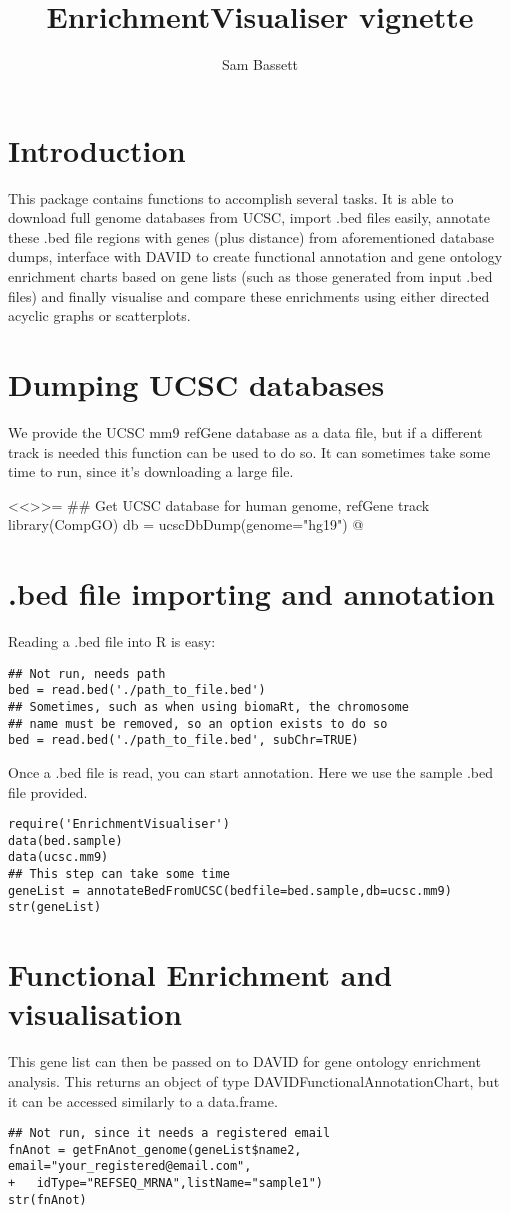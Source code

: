 \documentclass[11pt, oneside]{article}
\title{EnrichmentVisualiser vignette}
\author{Sam Bassett}
\affil{Developmental and Stem Cell Biology Lab,\\Victor Chang Cardiac Research Institute,\\Darlinghurst, Sydney, Australia}
\date{}
\begin{document}
\maketitle
\section{Introduction}
This package contains functions to accomplish several tasks. It is able to download full genome databases from UCSC, import .bed files easily, annotate these .bed file regions with genes (plus distance) from aforementioned database dumps, interface with DAVID to create functional annotation and gene ontology enrichment charts based on gene lists (such as those generated from input .bed files) and finally visualise and compare these enrichments using either directed acyclic graphs or scatterplots.

\section{Dumping UCSC databases}
We provide the UCSC mm9 refGene database as a data file, but if a different track is needed this function can be used to do so. It can sometimes take some time to run, since it's downloading a large file.

<<>>=
## Get UCSC database for human genome, refGene track
library(CompGO)
db = ucscDbDump(genome="hg19")
@

\section{.bed file importing and annotation}
Reading a .bed file into R is easy: \begin{verbatim}
## Not run, needs path
bed = read.bed('./path_to_file.bed')
## Sometimes, such as when using biomaRt, the chromosome
## name must be removed, so an option exists to do so
bed = read.bed('./path_to_file.bed', subChr=TRUE)
\end{verbatim}
Once a .bed file is read, you can start annotation. Here we use the sample .bed file provided.
\begin{verbatim}
require('EnrichmentVisualiser')
data(bed.sample)
data(ucsc.mm9)
## This step can take some time
geneList = annotateBedFromUCSC(bedfile=bed.sample,db=ucsc.mm9)
str(geneList)
\end{verbatim}

\section{Functional Enrichment and visualisation}
This gene list can then be passed on to DAVID for gene ontology enrichment analysis. This returns an object of type DAVIDFunctionalAnnotationChart, but it can be accessed similarly to a data.frame.
\begin{verbatim}
## Not run, since it needs a registered email
fnAnot = getFnAnot_genome(geneList$name2, email="your_registered@email.com",
+	idType="REFSEQ_MRNA",listName="sample1")
str(fnAnot)
\end{verbatim}
\end{document}

